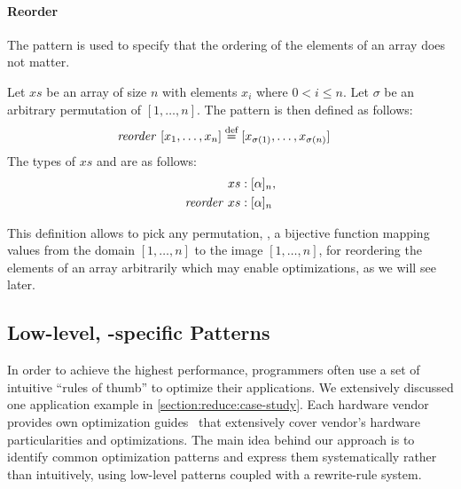 
\paragraph{Reorder}
The \reorder pattern is used to specify that the ordering of the elements of an array does not matter.

\begin{definition}
  \label{definition:pattern:reorder}
  Let $xs$ be an array of size $n$ with elements $x_i$ where $0 < i \leq n$.
  Let $\sigma$ be an arbitrary permutation of $[1,\ldots, n]$.
  The \reorder pattern is then defined as follows:
  \begin{align*}
    \text{\textit{reorder}}\ [x_1, \ldots, x_n] &\stackrel{\textrm{\scriptsize def}}{=} [x_{\sigma(1)}, \ldots, x_{\sigma(n)}]
  \end{align*}
  The types of $xs$ and \reorder are as follows:
  \begin{align*}
    xs &: [\alpha]_n,\\
    \text{\textit{reorder}}\ xs &: [\alpha]_n
  \end{align*}
\end{definition}

\noindent
This definition allows to pick any permutation, \ie, a bijective function mapping values from the domain $[1,\ldots, n]$ to the image $[1,\ldots, n]$, for reordering the elements of an array arbitrarily which may enable optimizations, as we will see later.





\subsection{Low-level, \OpenCL-specific Patterns}

In order to achieve the highest performance, programmers often use a set of intuitive ``rules of thumb'' to optimize their applications.
We extensively discussed one application example in \autoref{section:reduce:case-study}.
Each hardware vendor provides own optimization guides~\cite{CUDAProgrammingGuide,AMDProgrammingGuide,IntelGPUProgrammingGuide,IntelXeonProgrammingGuide} that extensively cover vendor's hardware particularities and optimizations.
The main idea behind our approach is to identify common optimization patterns and express them systematically rather than intuitively, using low-level patterns coupled with a rewrite-rule system.


